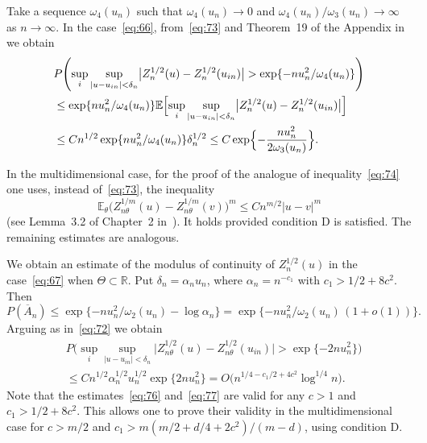 \documentclass[11pt,a4paper]{article}
\begin{document}
Take a sequence $\omega_4(u_n)$ such that $\omega_4(u_n)\to0$ and $\omega_4(u_n)/\omega_3(u_n)\to\infty$ as $n\to\infty$. In the case~\eqref{eq:66}, from~\eqref{eq:73} and Theorem~19 of the Appendix in~\cite{10} we obtain
\begin{align}
&P\Biggl(\sup_i\sup_{|u-u_{in}|<\delta_n}\bigl|Z_n^{1/2}(u)-Z_n^{1/2}(u_{in})\bigr|>\exp\{-nu_n^2/\omega_4(u_n)\}\Biggr)\notag\\
&\le\exp\{nu_n^2/\omega_4(u_n)\}\mathbb{E}\Bigl[\sup_i\sup_{|u-u_{in}|<\delta_n}\bigl|Z_n^{1/2}(u)-Z_n^{1/2}(u_{in})\bigr|\Bigr]\notag\\
&\le Cn^{1/2}\exp\{nu_n^2/\omega_4(u_n)\}\delta_n^{1/2}\le C\exp\Bigl\{-\frac{nu_n^2}{2\omega_3(u_n)}\Bigr\}.
\label{eq:74}
\end{align}

In the multidimensional case, for the proof of the analogue of inequality~\eqref{eq:74} one uses, instead of~\eqref{eq:73}, the inequality
\begin{equation}
\mathbb{E}_\theta\bigl(Z_{n\theta}^{1/m}(u)-Z_{n\theta}^{1/m}(v)\bigr)^m\le Cn^{m/2}|u-v|^m
\label{eq:75}
\end{equation}
(see Lemma~3.2 of Chapter~2 in~\cite{10}). It holds provided condition D is satisfied. The remaining estimates are analogous.

We obtain an estimate of the modulus of continuity of $Z_n^{1/2}(u)$ in the case~\eqref{eq:67} when $\Theta\subset\mathbb{R}$. Put $\delta_n=\alpha_n u_n$, where $\alpha_n=n^{-c_1}$ with $c_1>1/2+8c^2$. Then
\begin{equation}
P(\overline{A}_n)\le\exp\{-nu_n^2/\omega_2(u_n)-\log\alpha_n\}=\exp\{-nu_n^2/\omega_2(u_n)\,(1+o(1))\}.
\label{eq:76}
\end{equation}
Arguing as in~\eqref{eq:72} we obtain
\begin{equation}
\begin{split} &
P\Biggl(\sup_i\sup_{|u-u_{in}|<\delta_n}\bigl|Z_{n\theta}^{1/2}(u)-Z_{n\theta}^{1/2}(u_{in})\bigr|>\exp\{-2nu_n^2\}\Biggr)\\ &
\le Cn^{1/2}\alpha_n^{1/2}u_n^{1/2}\exp\{2nu_n^2\}=O\bigl(n^{1/4-c_1/2+4c^2}\log^{1/4}n\bigr).
\label{eq:77}
\end{split}
\end{equation}
Note that the estimates~\eqref{eq:76} and~\eqref{eq:77} are valid for any $c>1$ and $c_1>1/2+8c^2$. This allows one to prove their validity in the multidimensional case for $c>m/2$ and $c_1>m(m/2+d/4+2c^2)/(m-d)$, using condition D.
\end{document}
